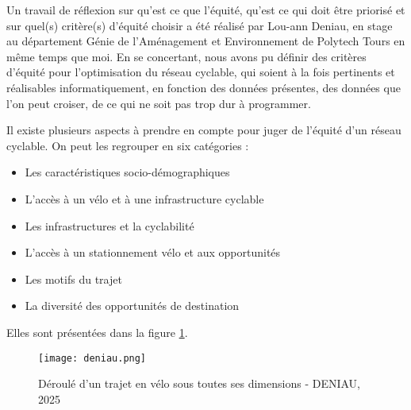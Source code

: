 Un travail de réflexion sur qu'est ce que l'équité, qu'est ce qui doit être priorisé et sur quel(s) critère(s) d'équité choisir a été réalisé par Lou-ann Deniau, en stage au département Génie de l'Aménagement et Environnement de Polytech Tours en même temps que moi. En se concertant, nous avons pu définir des critères d'équité pour l'optimisation du réseau cyclable, qui soient à la fois pertinents et réalisables informatiquement, en fonction des données présentes, des données que l'on peut croiser, de ce qui ne soit pas trop dur à programmer.

Il existe plusieurs aspects à prendre en compte pour juger de l'équité d'un réseau cyclable. On peut les regrouper en six catégories : 


\begin{itemize} \label{categories_eq}
    \item Les caractéristiques socio-démographiques
    \item L'accès à un vélo et à une infrastructure cyclable
    \item Les infrastructures et la cyclabilité
    \item L'accès à un stationnement vélo et aux opportunités
    \item Les motifs du trajet
    \item La diversité des opportunités de destination
\end{itemize}
Elles sont présentées dans la figure \ref{fig:d1}.

\begin{figure}[h]
    \centering
    \texttt{[image: deniau.png]}
    \caption{Déroulé d'un trajet en vélo sous toutes ses dimensions - DENIAU, 2025}
    \label{fig:d1}
\end{figure}

